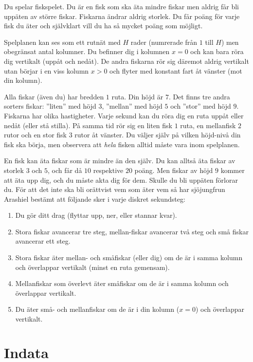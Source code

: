 Du spelar fiskspelet. Du är en fisk som ska äta mindre fiskar men aldrig får
bli uppäten av större fiskar. Fiskarna ändrar aldrig storlek. Du får poäng för varje fisk du äter och självklart vill du
ha så mycket poäng som möjligt.

Spelplanen kan ses som ett rutnät med $H$ rader (numrerade från $1$ till $H$) men obegränsat antal kolumner. Du befinner
dig i kolumnen $x=0$ och kan bara röra dig vertikalt (uppåt och nedåt). De andra fiskarna rör sig däremot aldrig vertikalt
utan börjar i en viss kolumn $x>0$ och flyter med konstant fart åt vänster (mot din kolumn). 

Alla fiskar (även du) har bredden $1$ ruta. Din höjd är $7$. Det finns tre andra sorters fiskar: ''liten'' med höjd $3$,
''mellan'' med höjd $5$ och ''stor'' med höjd $9$. Fiskarna har olika hastigheter. Varje sekund kan du röra dig en ruta
uppåt eller nedåt (eller stå stilla). På samma tid rör sig en liten fisk $1$ ruta, en mellanfisk $2$ rutor och en stor
fisk $3$ rutor åt vänster. Du väljer själv på vilken höjd-nivå din fisk ska börja, men observera att \emph{hela} fisken
alltid måste vara inom spelplanen. 


En fisk kan äta fiskar som är mindre än den själv. Du kan alltså äta fiskar av storlek $3$ och $5$, och får då $10$
respektive $20$ poäng. Men fiskar av höjd $9$ kommer att äta upp dig, och du måste akta dig för dem. Skulle du bli
uppäten förlorar du. För att det inte ska bli orättvist vem som
äter vem så har sjöjungfrun Arashiel bestämt att följande sker i varje diskret
sekundsteg:
\begin{enumerate}
  \item Du gör ditt drag (flyttar upp, ner, eller stannar kvar).
  \item Stora fiskar avancerar tre steg, mellan-fiskar avancerar två steg och små fiskar avancerar ett steg.
  \item Stora fiskar äter mellan- och småfiskar (eller dig) om de är i samma kolumn och överlappar vertikalt (minst en ruta gemensam).
  \item Mellanfiskar som överlevt äter småfiskar om de är i samma kolumn och överlappar vertikalt.
  \item Du äter små- och mellanfiskar om de är i din kolumn ($x=0$) och överlappar vertikalt.
\end{enumerate}

\section*{Indata}

